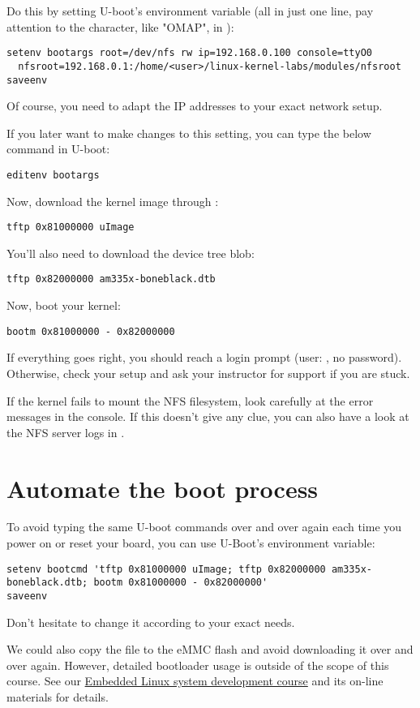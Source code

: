 Do this by setting U-boot's  environment variable (all in
just one line, pay attention to the  character, like "OMAP", in
):

\begin{verbatim}
setenv bootargs root=/dev/nfs rw ip=192.168.0.100 console=ttyO0
  nfsroot=192.168.0.1:/home/<user>/linux-kernel-labs/modules/nfsroot
saveenv
\end{verbatim}

Of course, you need to adapt the IP addresses to your exact network
setup.

If you later want to make changes to this setting, you can type the
below command in U-boot:

\begin{verbatim}
editenv bootargs
\end{verbatim}

Now, download the kernel image through :

\begin{verbatim}
tftp 0x81000000 uImage
\end{verbatim}

You'll also need to download the device tree blob:

\begin{verbatim}
tftp 0x82000000 am335x-boneblack.dtb
\end{verbatim}

Now, boot your kernel:

\begin{verbatim}
bootm 0x81000000 - 0x82000000
\end{verbatim}

If everything goes right, you should reach a login prompt (user:
, no password). Otherwise, check your setup and
ask your instructor for support if you are stuck.

If the kernel fails to mount the NFS filesystem, look carefully at the
error messages in the console. If this doesn't give any clue, you can
also have a look at the NFS server logs in .

\section{Automate the boot process}

To avoid typing the same U-boot commands over and over again each time
you power on or reset your board, you can use U-Boot's 
environment variable:

{\scriptsize
\begin{verbatim}
setenv bootcmd 'tftp 0x81000000 uImage; tftp 0x82000000 am335x-boneblack.dtb; bootm 0x81000000 - 0x82000000'
saveenv
\end{verbatim}
}

Don't hesitate to change it according to your exact needs.

We could also copy the  file to the eMMC flash and avoid
downloading it over and over again. However, detailed bootloader
usage is outside of the scope of this course. See our
\href{http://free-electrons.com/training/embedded-linux/}{Embedded
Linux system development course} and its on-line materials for
details.
